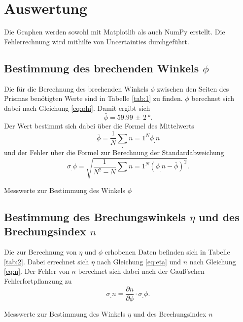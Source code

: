 \section{Auswertung}
\label{sec:Auswertung}


Die Graphen werden sowohl mit Matplotlib \cite{matplotlib} als auch NumPy \cite{numpy} erstellt. Die Fehlerrechnung wird mithilfe von Uncertainties \cite{uncertainties} durchgeführt.
\subsection{Bestimmung des brechenden Winkels $\phi$}

Die für die Berechnung des brechenden Winkels $\phi$ zwischen den Seiten des Prismas benötigten Werte sind in Tabelle \ref{tab:1} zu finden.
$\phi$ berechnet sich dabei nach Gleichung \eqref{eq:phi}.
Damit ergibt sich
\[
\bar{\phi} = \SI{59,99(2)}{\degree}\text{.}
\]
Der Wert bestimmt sich dabei über die Formel des Mittelwerts
\[
\bar{\phi} = \frac{1}{N}\sum_.{n=1}^N \phi_.n
\]
und der Fehler über die Formel zur Berechnung der Standardabweichung
\[
\sigma_.{\phi}=\sqrt{\frac{1}{N^2-N}\sum_.{n=1}^N \left(\phi_.n-\bar{\phi}\right)^2}\text{.}
\]

\begin{table}
	\centering
	\caption{Messwerte zur Bestimmung des Winkels $\phi$}
	
	\label{tab:1}
\end{table}
\noindent

\subsection{Bestimmung des Brechungswinkels $\eta$ und des Brechungsindex $n$}
Die zur Berechnung von $\eta$ und $\phi$ erhobenen Daten befinden sich in Tabelle \ref{tab:2}.
Dabei errechnet sich $\eta$ nach Gleichung \eqref{eq:eta} und $n$ nach Gleichung \eqref{eq:n}.
Der Fehler von $n$ berechnet sich dabei nach der Gauß'schen Fehlerfortpflanzung zu
\[
\sigma_.n=\frac{\partial n}{\partial \phi}\cdot \sigma_.{\phi}\text{.}
\]
\begin{table}
	\centering
	\caption{Messwerte zur Bestimmung des Winkels $\eta$ und des Brechungsindex $n$}
	
	\label{tab:2}
\end{table}

